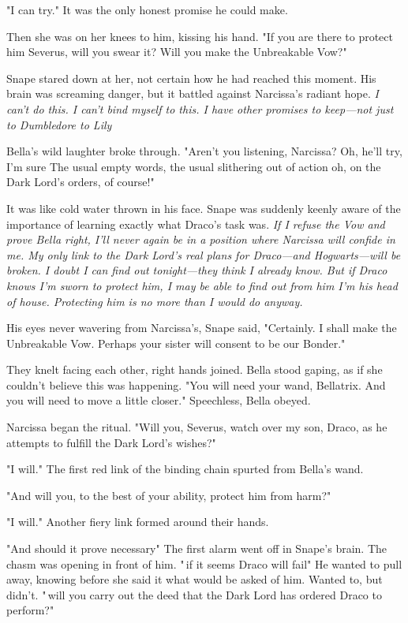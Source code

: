 "I can try." It was the only honest promise he could make.

Then she was on her knees to him, kissing his hand. "If you are there to protect him{\el} Severus, will you swear it? Will you make the Unbreakable Vow?"

Snape stared down at her, not certain how he had reached this moment. His brain was screaming danger, but it battled against Narcissa's radiant hope. \emph{I can't do this. I can't bind myself to this. I have other promises to keep—not just to Dumbledore{\el} to Lily{\el}}

Bella's wild laughter broke through. "Aren't you listening, Narcissa? Oh, he'll try, I'm sure{\el} The usual empty words, the usual slithering out of action{\el} oh, on the Dark Lord's orders, of course!"

It was like cold water thrown in his face. Snape was suddenly keenly aware of the importance of learning exactly what Draco's task was. \emph{If I refuse the Vow and prove Bella right, I'll never again be in a position where Narcissa will confide in me. My only link to the Dark Lord's real plans for Draco—and Hogwarts—will be broken. I doubt I can find out tonight—they think I already know. But if Draco knows I'm sworn to protect him, I may be able to find out from him{\el} I'm his head of house. Protecting him is no more than I would do anyway.}

His eyes never wavering from Narcissa's, Snape said, "Certainly. I shall make the Unbreakable Vow. Perhaps your sister will consent to be our Bonder."

They knelt facing each other, right hands joined. Bella stood gaping, as if she couldn't believe this was happening. "You will need your wand, Bellatrix. And you will need to move a little closer." Speechless, Bella obeyed.

Narcissa began the ritual. "Will you, Severus, watch over my son, Draco, as he attempts to fulfill the Dark Lord's wishes?"

"I will." The first red link of the binding chain spurted from Bella's wand.

"And will you, to the best of your ability, protect him from harm?"

"I will." Another fiery link formed around their hands.

"And should it prove necessary{\el}" The first alarm went off in Snape's brain. The chasm was opening in front of him. "{\el}\,if it seems Draco will fail{\el}" He wanted to pull away, knowing before she said it what would be asked of him. Wanted to, but didn't. "{\el}\,will you carry out the deed that the Dark Lord has ordered Draco to perform?"

